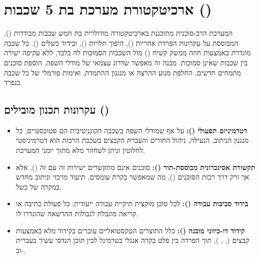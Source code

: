 
\section{ארכיטקטורת מערכת בת 5 שכבות ()}
\label{sec:5layer-arch}

המערכת הרב-סוכנית מתוכננת בארכיטקטורה מודולרית בת חמש שכבות מבודדות (), המבוססת על עקרונות הפרדת אחריות (), היפוך תלויות (), ובידוד כשלים (). כל שכבה מוגדרת באמצעות חוזה ממשק קשיח () מול השכבות הסמוכות לה בלבד, ללא עקיפה ישירה בין שכבות שאינן סמוכות. מבנה זה מאפשר שדרוג עצמאי של מודלי השפה, הוספת סוכנים מתמחים חדשים, החלפת מנוע ההרצה או מנגנון ההתמדה, ואימות פורמלי של כל שכבה בנפרד.

\subsection{עקרונות תכנון מובילים ()}
\begin{itemize}[leftmargin=1.2cm]
  \item \textbf{דטרמיניזם תפעולי ():} על אף שמודלי השפה בשכבה הקוגניטיבית הם סטוכסטיים, כל מנגנון הניתוב, הנעילה, ניהול התורים והעברת הקבצים בשכבת הרכזת הוא דטרמיניסטי לחלוטין וניתן לשחזור מלא מתוך יומני המערכת.
  \item \textbf{תקשורת אסינכרונית מבוססת-תור ():} סוכנים אינם מתקשרים ישירות זה עם זה (), אלא אך ורק דרך רכזת הסוכנים (), מה שמאפשר בקרת עומסים, תיעוד מרכזי וניתוב מחדש במקרה של כשל.
  \item \textbf{בידוד סביבות עבודה ():} לכל סוכן מוקצית תיקיית עבודה ייעודית; כל פעולת כתיבה או קריאה מוגבלת לגבולות ההרשאה שהוגדרו לו.
  \item \textbf{קידוד דו-כיווני מובנה ():} כלל התוצרים הטקסטואליים עוברים בקידוד  מלא באמצעות קבצים (, , ), תוך הפרדה בין פלט בקרה אנגלי בטרמינל לבין תוכן הנדסי עשיר בעברית וב-.
\end{itemize}

